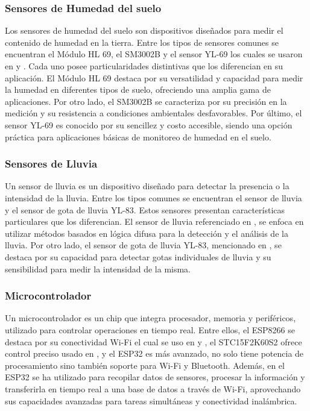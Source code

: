 \subsubsection*{Sensores de Humedad del suelo}
Los sensores de humedad del suelo son dispositivos diseñados para medir el contenido de humedad en la tierra. Entre los tipos de sensores comunes se encuentran el Módulo HL 69, el SM3002B y el sensor YL-69 los cuales se usaron en \cite{alcivar_dominguez_sistema_2018} \cite{haiyan_intelligent_2022} y \cite{haiyan_intelligent_2022}. Cada uno posee particularidades distintivas que los diferencian en su aplicación. El Módulo HL 69 destaca por su versatilidad y capacidad para medir la humedad en diferentes tipos de suelo, ofreciendo una amplia gama de aplicaciones. Por otro lado, el SM3002B se caracteriza por su precisión en la medición y su resistencia a condiciones ambientales desfavorables. Por último, el sensor YL-69 es conocido por su sencillez y costo accesible, siendo una opción práctica para aplicaciones básicas de monitoreo de humedad en el suelo.

\subsubsection*{Sensores de Lluvia}
Un sensor de lluvia es un dispositivo diseñado para detectar la presencia o la intensidad de la lluvia. Entre los tipos comunes se encuentran el sensor de lluvia y el sensor de gota de lluvia YL-83. Estos sensores presentan características particulares que los diferencian. El sensor de lluvia referenciado en \cite{krishnan_fuzzy_2020}, se enfoca en utilizar métodos basados en lógica difusa para la detección y el análisis de la lluvia. Por otro lado, el sensor de gota de lluvia YL-83, mencionado en \cite{alcivar_dominguez_sistema_2018}, se destaca por su capacidad para detectar gotas individuales de lluvia y su sensibilidad para medir la intensidad de la misma.

\subsubsection*{Microcontrolador}
Un microcontrolador es un chip que integra procesador, memoria y periféricos, utilizado para controlar operaciones en tiempo real. Entre ellos, el ESP8266 se destaca por su conectividad Wi-Fi el cual se uso en \cite{hasan_implementation_2018} y \cite{widyawati_fuzzy_2022}, el STC15F2K60S2 ofrece control preciso usado en \cite{haiyan_intelligent_2022}, y el ESP32 es más avanzado, no solo tiene potencia de procesamiento sino también soporte para Wi-Fi y Bluetooth. Además, en \cite{ramos_galindo_diseno_2023} el ESP32 se ha utilizado para recopilar datos de sensores, procesar la información y transferirla en tiempo real a una base de datos a través de Wi-Fi, aprovechando sus capacidades avanzadas para tareas simultáneas y conectividad inalámbrica.

